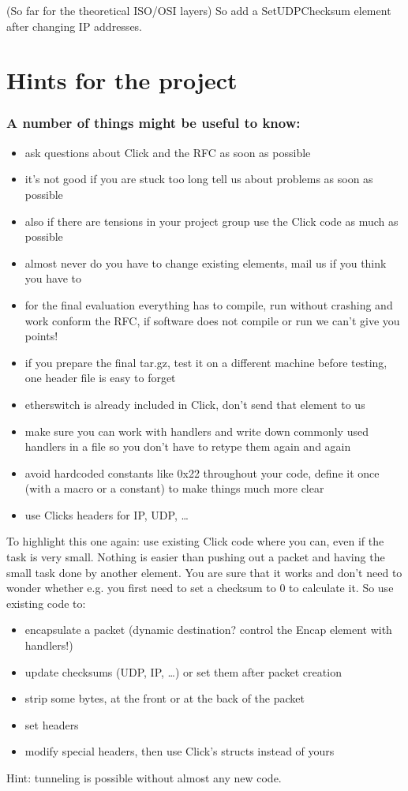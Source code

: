 \documentclass[a4paper]{article}
\begin{document}
(So far for the theoretical ISO/OSI layers) So add a SetUDPChecksum
element after changing IP addresses.

\section{Hints for the project}

\subsubsection*{A number of things might be useful to know:}

\begin{itemize}
\item
  ask questions about Click and the RFC as soon as possible
\item
  it's not good if you are stuck too long tell us about problems as soon
  as possible
\item
  also if there are tensions in your project group use the Click code as
  much as possible
\item
  almost never do you have to change existing elements, mail us if you
  think you have to
\item
  for the final evaluation everything has to compile, run without
  crashing and work conform the RFC, if software does not compile or run
  we can't give you points!
\item
  if you prepare the final tar.gz, test it on a different machine before
  testing, one header file is easy to forget
\item
  etherswitch is already included in Click, don't send that element to
  us
\item
  make sure you can work with handlers and write down commonly used
  handlers in a file so you don't have to retype them again and again
\item
  avoid hardcoded constants like 0x22 throughout your code, define it
  once (with a macro or a constant) to make things much more clear
\item
  use Clicks headers for IP, UDP, \ldots{}
\end{itemize}

To highlight this one again: use existing Click code where you can, even
if the task is very small. Nothing is easier than pushing out a packet
and having the small task done by another element. You are sure that it
works and don't need to wonder whether e.g. you first need to set a
checksum to 0 to calculate it. So use existing code to:

\begin{itemize}
\item
  encapsulate a packet (dynamic destination? control the Encap element
  with handlers!)
\item
  update checksums (UDP, IP, \ldots{}) or set them after packet creation
\item
  strip some bytes, at the front or at the back of the packet
\item
  set headers
\item
  modify special headers, then use Click's structs instead of yours
\end{itemize}

Hint: tunneling is possible without almost any new code.
\end{document}
